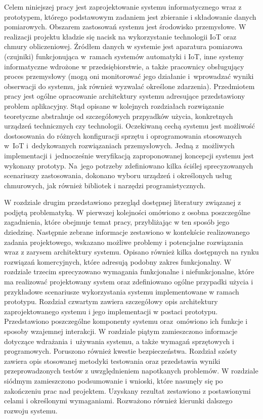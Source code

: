 \documentclass[a4paper, 12pt, twoside]{article}
\begin{document}
Celem niniejszej pracy jest zaprojektowanie systemu informatycznego
wraz z prototypem, którego podstawowym zadaniem jest zbieranie i składowanie danych pomiarowych.
Obszarem zastosowań systemu jest środowisko przemysłowe.
W realizacji projektu kładzie się nacisk na wykorzystanie technologii IoT
oraz chmury obliczeniowej. Źródłem danych w systemie
jest aparatura pomiarowa (czujniki) funkcjonująca w~ramach systemów automatyki i IoT,
inne systemy informatyczne wdrożone w przedsiębiorstwie,
a także pracownicy obsługujący proces przemysłowy (mogą oni monitorować jego działanie
i~wprowadzać wyniki obserwacji do systemu, jak również wyzwalać określone zdarzenia).
Przedmiotem pracy jest ogólne opracowanie architektury
systemu adresujące przedstawiony problem aplikacyjny. Stąd opisane w kolejnych rozdziałach
rozwiązanie teoretyczne abstrahuje od szczegółowych przpyadków użycia, konkretnych urządzeń
technicznych czy technologii. Oczekiwaną cechą systemu jest możliwość dostosowania
do różnych konfiguracji sprzętu i oprogramowania stosowanych w~IoT i~dedykowanych
rozwiązaniach przemysłowych. Jedną z~możliwych implementacji i~jednocześnie weryfikacją
zaproponowanej koncepcji systemu jest wykonany prototyp. Na~jego potrzeby zdefiniowano
kilka ściślej sprecyzowanych scenariuszy zastosowania, dokonano wyboru urządzeń
i określonych usług chmurowych, jak również bibliotek i narzędzi programistycznych.

W rozdziale drugim przedstawiono przegląd dostępnej literatury związanej z podjętą problematyką.
W pierwszej kolejności omówiono z osobna poszczególne zagadnienia, które
obejmuje temat pracy, przybliżając w ten sposób jego dziedzinę.
Następnie zebrane informacje zestawiono w kontekście realizowanego zadania projektowego,
wskazano możliwe problemy i potencjalne rozwiązania wraz z zarysem architektury
systemu. Opisano również kilka dostępnych na rynku rozwiązań komercyjnych,
które adresują podobny zakres funkcjonalny. W rozdziale trzecim sprecyzowano
wymagania funkcjonalne i niefunkcjonalne, które ma realizować projektowany system
oraz zdefiniowano ogólne przypadki użycia i przykładowe scenariusze wykorzystania systemu
implementowane w ramach prototypu. Rozdział czwartym zawiera
szczegółowy opis architektury zaprojektowanego systemu i jego implementacji
w postaci prototypu. Przedstawiono poszczególne
komponenty systemu oraz~omówiono ich funkcje i sposoby wzajemnej interakcji.
W rozdziale piątym zamieszczono informacje dotyczące
wdrażania i~używania systemu, a także wymagań sprzętowych i programowych.
Poruszono również kwestie bezpieczeństwa. Rozdział szósty zawiera
opis stosowanej metodyki testowania oraz przedstawia wyniki przeprowadzonych
testów z uwzględnieniem napotkanych problemów. W rozdziale siódmym zamieszczono
podsumowanie i wnioski, które nasunęły się po zakończeniu prac nad projektem.
Uzyskany rezultat zestawiono z postawionymi celami i określonymi wymaganiami.
Rozważono również kierunki dalszego rozwoju systemu.
\end{document}
